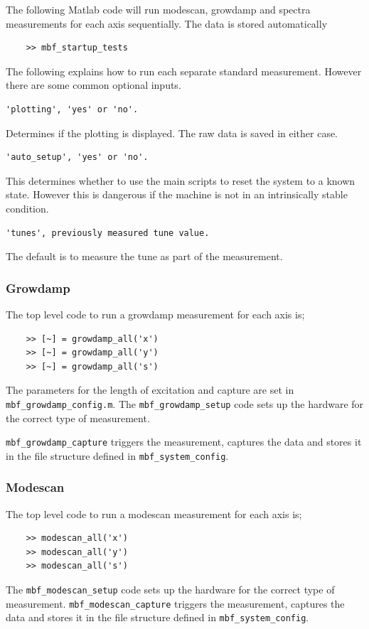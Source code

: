 \documentclass{report}
\begin{document}
The following Matlab code will run modescan, growdamp and spectra measurements for each axis sequentially. The data is stored automatically 
\begin{verbatim}
    >> mbf_startup_tests 
\end{verbatim}
\vspace{2mm}
The following explains how to run each separate standard measurement. However there are some common optional inputs.
\begin{verbatim}
'plotting', 'yes' or 'no'. 
\end{verbatim}
Determines if the plotting is displayed. The raw data is saved in either case.
\begin{verbatim}
'auto_setup', 'yes' or 'no'. 
\end{verbatim}
This determines whether to use the main scripts to reset the system to a known state. However this is dangerous if the machine is not in an intrinsically stable condition.
\begin{verbatim}
'tunes', previously measured tune value.
\end{verbatim}
The default is to measure the tune as part of the measurement.
\subsubsection{Growdamp}
The top level code to run a growdamp measurement for each axis is; 
\begin{verbatim}
    >> [~] = growdamp_all('x') 
    >> [~] = growdamp_all('y') 
    >> [~] = growdamp_all('s') 
\end{verbatim}

The parameters for the length of excitation and  capture are set in \verb|mbf_growdamp_config.m|.
 The \verb|mbf_growdamp_setup| code sets up the hardware for the correct type of measurement. 
 
 \verb|mbf_growdamp_capture| triggers the measurement, captures the data and stores it in the file structure defined in \verb|mbf_system_config|. 
\subsubsection{Modescan}
The top level code to run a modescan measurement for each axis is; 
\begin{verbatim}
    >> modescan_all('x') 
    >> modescan_all('y') 
    >> modescan_all('s') 
\end{verbatim}

The \verb|mbf_modescan_setup| code sets up the hardware for the correct type of measurement. \verb|mbf_modescan_capture| triggers the measurement, captures the data and stores it in the file structure defined in \verb|mbf_system_config|. 
\end{document}
